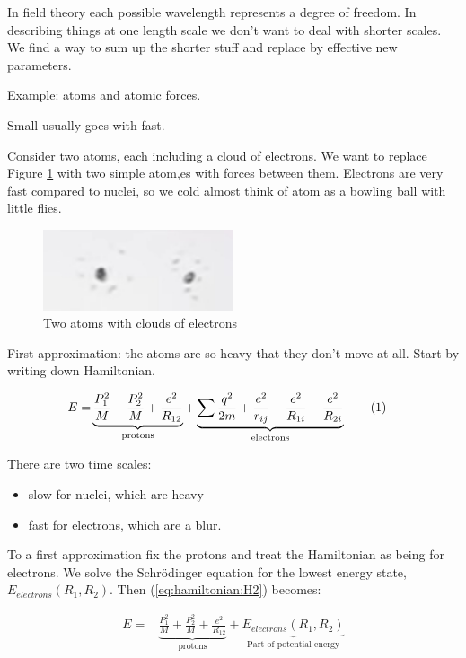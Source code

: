 \documentclass[]{article}
\newcommand\numberthis{\addtocounter{equation}{1}\tag{\theequation}}
\begin{document}
In field theory each possible wavelength represents a degree of freedom. In describing things at one length scale we don't want to deal with shorter scales. We find a way to sum up the shorter stuff and replace by effective new parameters.

Example: atoms and atomic forces.

Small usually goes with fast.

Consider two atoms, each including a cloud of electrons. We want to replace Figure \ref{fig:3-2-atoms} with two simple atom,es with forces between them. Electrons are very fast compared to nuclei, so we cold almost think of atom as a bowling ball with little flies.

\begin{figure}[H]
	\begin{center}
		\caption{Two atoms with clouds of electrons}\label{fig:3-2-atoms}
		\includegraphics[width=0.5\textwidth]{3-2-atoms}
	\end{center}
\end{figure}

First approximation: the atoms are so heavy that they don't move at all. Start by writing down Hamiltonian.

\begin{align*}
	E=& \underbrace{\frac{P_1^2}{M} + \frac{P_2^2}{M} + \frac{e^2}{R_{12}}}_\text{protons} + \underbrace{\sum \frac{q^2}{2m} + \frac{e^2}{r_{ij}}- \frac{e^2}{R_{1i}} - \frac{e^2}{R_{2i}}}_\text{electrons} \numberthis \label{eq:hamiltonian:H2}
\end{align*}

There are two time scales:
\begin{itemize}
	\item slow for nuclei, which are heavy
	\item fast for electrons, which are a blur.
\end{itemize}

To a first approximation fix the protons and treat the Hamiltonian as being for electrons. We solve the Schr\"odinger equation for the lowest energy state, $E_{electrons}(R_1,R_2)$. Then (\ref{eq:hamiltonian:H2}) becomes:


\begin{align*}
E=& \underbrace{\frac{P_1^2}{M} + \frac{P_2^2}{M} + \frac{e^2}{R_{12}}}_\text{protons} +\underbrace{ E_{electrons}(R_1,R_2)}_\text{Part of potential energy}
\end{align*}
\end{document}
